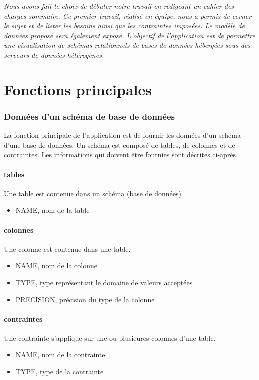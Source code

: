\textit{Nous avons fait le choix de débuter notre travail en rédigeant un cahier des charges sommaire. Ce premier travail, réalisé en équipe, nous a permis de cerner le sujet et de lister les besoins ainsi que les contraintes imposées. Le modèle de données proposé sera également exposé. L’objectif de l'application est de permettre une visualisation de schémas relationnels de bases de données hébergées sous des serveurs de données hétérogènes.}


\section{Fonctions principales}
		\subsubsection{Données d'un schéma de base de données}
		La fonction principale de l'application est de fournir les données d'un schéma
		d'une base de données. Un schéma est composé de tables, de colonnes et de contraintes. Les informations qui doivent être fournies sont décrites ci-après.
		
			\paragraph{tables}
			Une table est contenue dans un schéma (base de données)
				\begin{itemize}
					\item NAME, nom de la table
				\end{itemize}
				
			\paragraph{colonnes}
			Une colonne est contenue dans une table.
				\begin{itemize}
					\item NAME, nom de la colonne
					\item TYPE, type représentant le domaine de valeurs acceptées
					\item PRECISION, précision du type de la colonne
				\end{itemize}
				
			\paragraph{contraintes}
			Une contrainte s'applique sur une ou plusieures colonnes d'une table.
				\begin{itemize}
					\item NAME, nom de la contrainte
					\item TYPE, type de la contrainte
				\end{itemize} 
				

